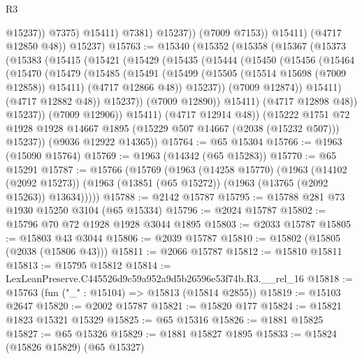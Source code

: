 \begin{lexlean}{R3}
\begin{coremodule}
                          @15237))
                      @7375)
                    @15411)
                  @7381)
                @15237))
            (@7009 @7153))
          @15411)
        (@4717 @12850 @48))
      @15237)
@15763 := @15340
    (@15352
      (@15358
        (@15367
          (@15373
            (@15383
              (@15415
                (@15421
                  (@15429
                    (@15435
                      (@15444
                        (@15450
                          (@15456
                            (@15464
                              (@15470
                                (@15479
                                  (@15485
                                    (@15491
                                      (@15499
                                        (@15505 (@15514 @15698 (@7009 @12858)) @15411)
                                        (@4717 @12866 @48))
                                      @15237))
                                  (@7009 @12874))
                                @15411)
                              (@4717 @12882 @48))
                            @15237))
                        (@7009 @12890))
                      @15411)
                    (@4717 @12898 @48))
                  @15237))
              (@7009 @12906))
            @15411)
          (@4717 @12914 @48))
        (@15222
          @1751
          @72
          @1928
          @1928
          @14667
          @1895
          (@15229 @507 @14667 (@2038 (@15232 @507)))
          @15237))
      (@9036 @12922 @14365))
@15764 := @65 @15304
@15766 := @1963 (@15090 @15764)
@15769 := @1963 (@14342 (@65 @15283))
@15770 := @65 @15291
@15787 := @15766
    (@15769
      (@1963
        (@14258 @15770)
        (@1963
          (@14102 (@2092 @15273))
          (@1963 (@13851 (@65 @15272)) (@1963 (@13765 (@2092 @15263)) @13634)))))
@15788 := @2142 @15787
@15795 := @15788 @281 @73 @1930 @15250 @3104 (@65 @15334)
@15796 := @2024 @15787
@15802 := @15796 @70 @72 @1928 @1928 @3044 @1895
@15803 := @2033 @15787
@15805 := @15803 @43 @3044
@15806 := @2039 @15787
@15810 := @15802 (@15805 (@2038 (@15806 @43)))
@15811 := @2066 @15787
@15812 := @15810 @15811
@15813 := @15795 @15812
@15814 := LexLeanPreserve.C445526d9c59a952a9d5b26596e53f74b.R3.__rel_16
@15818 := @15763 (fun ("_" : @15104) => @15813 (@15814 @2855))
@15819 := @15103 @2647
@15820 := @2002 @15787
@15821 := @15820 @177
@15824 := @15821 @1823 @15321 @15329
@15825 := @65 @15316
@15826 := @1881 @15825
@15827 := @65 @15326
@15829 := @1881 @15827 @1895
@15833 := @15824 (@15826 @15829) (@65 @15327)

\end{coremodule}
\end{lexlean}
